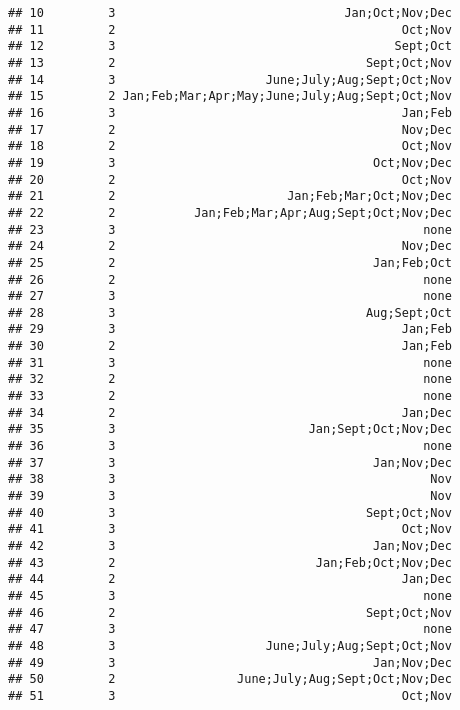 \documentclass[
]{article}
\begin{document}
\begin{verbatim}
## 10         3                                Jan;Oct;Nov;Dec
## 11         2                                        Oct;Nov
## 12         3                                       Sept;Oct
## 13         2                                   Sept;Oct;Nov
## 14         3                     June;July;Aug;Sept;Oct;Nov
## 15         2 Jan;Feb;Mar;Apr;May;June;July;Aug;Sept;Oct;Nov
## 16         3                                        Jan;Feb
## 17         2                                        Nov;Dec
## 18         2                                        Oct;Nov
## 19         3                                    Oct;Nov;Dec
## 20         2                                        Oct;Nov
## 21         2                        Jan;Feb;Mar;Oct;Nov;Dec
## 22         2           Jan;Feb;Mar;Apr;Aug;Sept;Oct;Nov;Dec
## 23         3                                           none
## 24         2                                        Nov;Dec
## 25         2                                    Jan;Feb;Oct
## 26         2                                           none
## 27         3                                           none
## 28         3                                   Aug;Sept;Oct
## 29         3                                        Jan;Feb
## 30         2                                        Jan;Feb
## 31         3                                           none
## 32         2                                           none
## 33         2                                           none
## 34         2                                        Jan;Dec
## 35         3                           Jan;Sept;Oct;Nov;Dec
## 36         3                                           none
## 37         3                                    Jan;Nov;Dec
## 38         3                                            Nov
## 39         3                                            Nov
## 40         3                                   Sept;Oct;Nov
## 41         3                                        Oct;Nov
## 42         3                                    Jan;Nov;Dec
## 43         2                            Jan;Feb;Oct;Nov;Dec
## 44         2                                        Jan;Dec
## 45         3                                           none
## 46         2                                   Sept;Oct;Nov
## 47         3                                           none
## 48         3                     June;July;Aug;Sept;Oct;Nov
## 49         3                                    Jan;Nov;Dec
## 50         2                 June;July;Aug;Sept;Oct;Nov;Dec
## 51         3                                        Oct;Nov

\end{verbatim}
\end{document}
